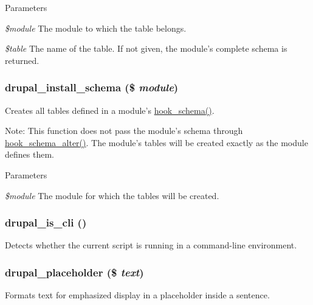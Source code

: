\begin{DoxyParams}{Parameters}
\item[{\em \$module}]The module to which the table belongs. \item[{\em \$table}]The name of the table. If not given, the module's complete schema is returned. \end{DoxyParams}
\hypertarget{group__schemaapi_ga9706b8d6ecdac10302d83bd50935a698}{
\subsubsection[{drupal\_\-install\_\-schema}]{\setlength{\rightskip}{0pt plus 5cm}drupal\_\-install\_\-schema (\$ {\em module})}}
\label{group__schemaapi_ga9706b8d6ecdac10302d83bd50935a698}
Creates all tables defined in a module's \hyperlink{group__schemaapi_ga9abd926ddaf68a22e6dca28a25d0c6f5}{hook\_\-schema()}.

Note: This function does not pass the module's schema through \hyperlink{group__schemaapi_ga4a00aaeabd6903f707d8385476b9ae2a}{hook\_\-schema\_\-alter()}. The module's tables will be created exactly as the module defines them.


\begin{DoxyParams}{Parameters}
\item[{\em \$module}]The module for which the tables will be created. \end{DoxyParams}
\hypertarget{group__schemaapi_gac880b82ae302f9d15c64d264a269d1f4}{
\subsubsection[{drupal\_\-is\_\-cli}]{\setlength{\rightskip}{0pt plus 5cm}drupal\_\-is\_\-cli ()}}
\label{group__schemaapi_gac880b82ae302f9d15c64d264a269d1f4}
Detects whether the current script is running in a command-\/line environment. \hypertarget{group__schemaapi_ga4ab49ad51d8b93bb296a8492296d655b}{
\subsubsection[{drupal\_\-placeholder}]{\setlength{\rightskip}{0pt plus 5cm}drupal\_\-placeholder (\$ {\em text})}}
\label{group__schemaapi_ga4ab49ad51d8b93bb296a8492296d655b}
Formats text for emphasized display in a placeholder inside a sentence.

